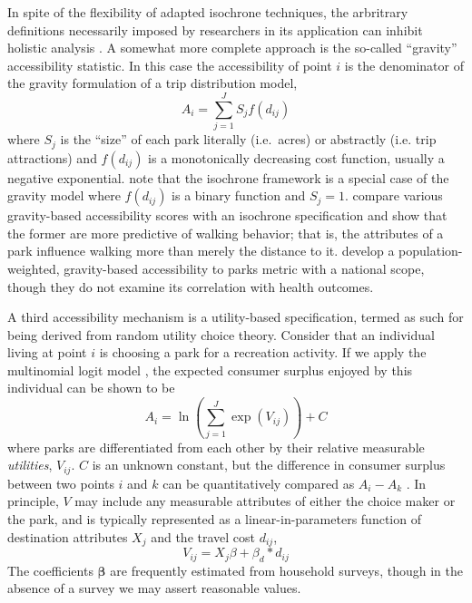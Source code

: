 \documentclass[Afour,sageh.bst]{sagej}
\newcommand{\vect}[1]{\boldsymbol{#1}}
\begin{document}
In spite of the flexibility of adapted isochrone techniques, the
arbritrary definitions necessarily imposed by researchers in its
application can inhibit holistic analysis \citep{Logan2017}. A somewhat
more complete approach is the so-called ``gravity'' accessibility
statistic. In this case the accessibility of point \(i\) is the
denominator of the gravity formulation of a trip distribution model,
\begin{equation}\label{eq:gravity}
A_i = \sum_{j = 1}^J S_j f(d_{ij})
\end{equation} where \(S_j\) is the ``size'' of each park literally
(i.e.~acres) or abstractly (i.e. trip attractions) and \(f(d_{ij})\) is
a monotonically decreasing cost function, usually a negative
exponential. \citet{Dong2006} note that the isochrone framework is a
special case of the gravity model where \(f(d_{ij})\) is a binary
function and \(S_j = 1\). \citet{Giles-Corti2005} compare various
gravity-based accessibility scores with an isochrone specification and
show that the former are more predictive of walking behavior; that is,
the attributes of a park influence walking more than merely the distance
to it. \citet{Zhang2011} develop a population-weighted, gravity-based
accessibility to parks metric with a national scope, though they do not
examine its correlation with health outcomes.

A third accessibility mechanism is a utility-based specification, termed
as such for being derived from random utility choice theory. Consider
that an individual living at point \(i\) is choosing a park for a
recreation activity. If we apply the multinomial logit model
\citep{McFadden1974}, the expected consumer surplus enjoyed by this
individual can be shown to be \begin{equation}\label{eq:utility}
A_i = \ln\left({\sum_{j = 1}^J\exp(V_{ij})}\right) + C
\end{equation} where parks are differentiated from each other by their
relative measurable \emph{utilities}, \(V_{ij}\). \(C\) is an unknown
constant, but the difference in consumer surplus between two points
\(i\) and \(k\) can be quantitatively compared as \(A_i - A_k\)
\citep{Bruce1977}. In principle, \(V\) may include any measurable
attributes of either the choice maker or the park, and is typically
represented as a linear-in-parameters function of destination attributes
\(X_j\) and the travel cost \(d_{ij}\),
\begin{equation}\label{eq:utilityV}
V_{ij} = X_j\beta + \beta_d * d_{ij}
\end{equation} The coefficients \(\vect{\beta}\) are frequently
estimated from household surveys, though in the absence of a survey we
may assert reasonable values.
\end{document}
